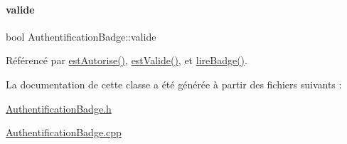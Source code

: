\mbox{\label{class_authentification_badge_a9d0df9da3663b065a3a6a7a1f37a0a69}} 
\paragraph{\texorpdfstring{valide}{valide}}
{\footnotesize\ttfamily bool Authentification\+Badge\+::valide\hspace{0.3cm}{\ttfamily [private]}}



Référencé par \hyperlink{class_authentification_badge_aceb9c5a09dddbff73cd02973913c79c1}{est\+Autorise()}, \hyperlink{class_authentification_badge_af320bf9cdbb285c48cd323e0ec3ef529}{est\+Valide()}, et \hyperlink{class_authentification_badge_a77488a375465873bfe6ab62f53abea6d}{lire\+Badge()}.



La documentation de cette classe a été générée à partir des fichiers suivants \+:\begin{DoxyCompactItemize}
\item 
\hyperlink{_authentification_badge_8h}{Authentification\+Badge.\+h}\item 
\hyperlink{_authentification_badge_8cpp}{Authentification\+Badge.\+cpp}\end{DoxyCompactItemize}
